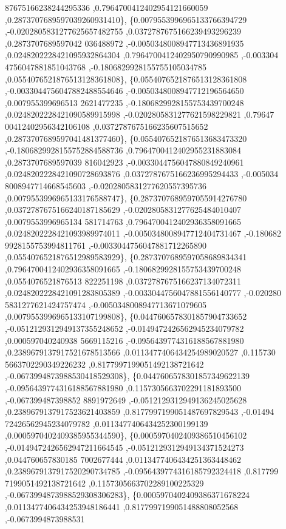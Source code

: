 \begin{DoxyCode}
      87675166238244295336 ,0.7964700412402954121660059 ,0.2873707689597039260931410\},
\{0.0079553996965133766394729 ,-0.0202805831277625657482755 ,0.0372787675166239493296239 ,0.2873707689597042
      036488972 ,-0.0050348008947713436891935 ,0.0248202228421095932864304 ,0.7964700412402950790990985 ,-0.003304
      4756047881851043768 ,-0.1806829928155755105034785 ,0.0554076521876513128361808\},
\{0.0554076521876513128361808 ,-0.0033044756047882488554646 ,-0.0050348008947712196564650 ,0.007955399696513
      2621477235 ,-0.1806829928155753439700248 ,0.0248202228421090589915998 ,-0.0202805831277621598229821 ,0.79647
      00412402956342106108 ,0.0372787675166235607515652 ,0.2873707689597041481377460\},
\{0.0554076521876513683473320 ,-0.1806829928155752884588736 ,0.7964700412402955231883084 ,0.2873707689597039
      816042923 ,-0.0033044756047880849240961 ,0.0248202228421090728693876 ,0.0372787675166236995294433 ,-0.005034
      8008947714668545603 ,-0.0202805831277620557395736 ,0.0079553996965133176588747\},
\{0.2873707689597055914276780 ,0.0372787675166240187185629 ,-0.0202805831277625484010407 ,0.0079553996965134
      581714763 ,0.7964700412402936358091665 ,0.0248202228421093989974011 ,-0.0050348008947712404731467 ,-0.180682
      9928155753994811761 ,-0.0033044756047881712265890 ,0.0554076521876512989583929\},
\{0.2873707689597058689834341 ,0.7964700412402936358091665 ,-0.1806829928155753439700248 ,0.0554076521876513
      822251198 ,0.0372787675166237134072311 ,0.0248202228421091283805389 ,-0.0033044756047881556140777 ,-0.020280
      5831277621424757474 ,-0.0050348008947713671079605 ,0.0079553996965133107199808\},
\{0.0447606578301857904733652 ,-0.0512129312949137355248652 ,-0.0149472426562945234079782 ,0.000597040240938
      5669115216 ,-0.0956439774316188567881980 ,0.2389679137917521678513566 ,0.0113477406434254989020527 ,0.115730
      5663702290349226232 ,0.8177997199051492138721642 ,-0.0673994873988530418529308\},
\{0.0447606578301857349622139 ,-0.0956439774316188567881980 ,0.1157305663702291181893500 ,-0.067399487398852
      8891972649 ,-0.0512129312949136245025628 ,0.2389679137917523621403859 ,0.8177997199051487697829543 ,-0.01494
      72426562945234079782 ,0.0113477406434252300199139 ,0.0005970402409385955344590\},
\{0.0005970402409386510456102 ,-0.0149472426562947211664545 ,-0.0512129312949134371524273 ,0.044760657830185
      7002677444 ,0.0113477406434251363448462 ,0.2389679137917520290734785 ,-0.0956439774316185792324418 ,0.817799
      7199051492138721642 ,0.1157305663702289100225329 ,-0.0673994873988529308306283\},
\{0.0005970402409386371678224 ,0.0113477406434253948186441 ,0.8177997199051488808052568 ,-0.0673994873988531

\end{DoxyCode}
